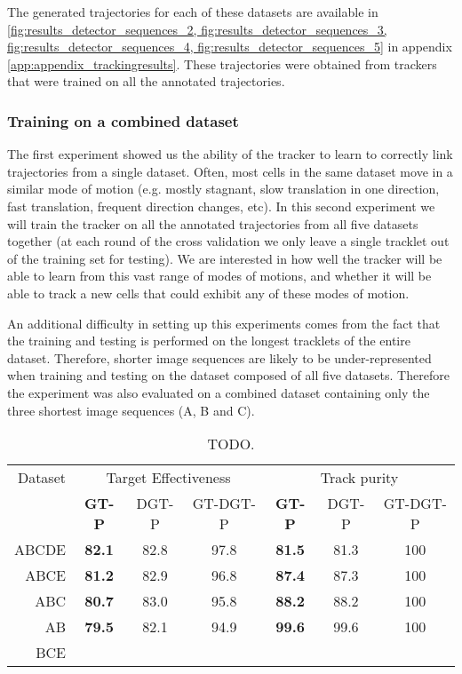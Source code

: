 		The generated trajectories for each of these datasets are available in \cref{fig:results_detector_sequences_2, fig:results_detector_sequences_3, fig:results_detector_sequences_4, fig:results_detector_sequences_5} in appendix \ref{app:appendix_trackingresults}. These trajectories were obtained from trackers that were trained on all the annotated trajectories.
		
		\subsubsection{Training on a combined dataset \statusnew}
		
		The first experiment showed us the ability of the tracker to learn to correctly link trajectories from a single dataset. Often, most cells in the same dataset move in a similar mode of motion (e.g. mostly stagnant, slow translation in one direction, fast translation, frequent direction changes, etc). In this second experiment we will train the tracker on all the annotated trajectories from all five datasets together (at each round of the cross validation we only leave a single tracklet out of the training set for testing). We are interested in how well the tracker will be able to learn from this vast range of modes of motions, and whether it will be able to track a new cells that could exhibit any of these modes of motion.
		
		An additional difficulty in setting up this experiments comes from the fact that the training and testing is performed on the longest tracklets of the entire dataset. Therefore, shorter image sequences are likely to be under-represented when training and testing on the dataset composed of all five datasets. Therefore the experiment was also evaluated on a combined dataset containing only the three shortest image sequences (A, B and C).
		

		\begin{table}[h]
			\centering
			\begin{tabular}{r*{3}{c}*{3}{c}}
				Dataset & \multicolumn{3}{c}{Target Effectiveness} & \multicolumn{3}{c}{Track purity} \\
				        & \textbf{GT-P} & DGT-P &     GT-DGT-P     & \textbf{GT-P} & DGT-P & GT-DGT-P \\
			\hline
				  ABCDE & \textbf{82.1} & 82.8  &       97.8       & \textbf{81.5} & 81.3  &   100    \\
				   ABCE & \textbf{81.2} & 82.9  &       96.8       & \textbf{87.4} & 87.3  &   100    \\
				    ABC & \textbf{80.7} & 83.0  &       95.8       & \textbf{88.2} & 88.2  &   100    \\
				     AB & \textbf{79.5} & 82.1  &       94.9       & \textbf{99.6} & 99.6  &   100   \\
				    BCE & \textbf{} &  &     & \textbf{} &  &       \\
			\end{tabular} 
			\caption{TODO.}
			\label{tab:results_tracker_combined}
		\end{table}


